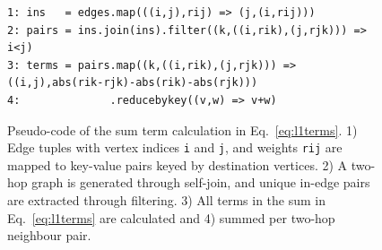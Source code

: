 \documentclass[conference]{IEEEtran}
\begin{document}
\begin{figure}
\begin{lstlisting}
1: ins   = edges.map(((i,j),rij) => (j,(i,rij)))
2: pairs = ins.join(ins).filter((k,((i,rik),(j,rjk))) => i<j)
3: terms = pairs.map((k,((i,rik),(j,rjk))) => ((i,j),abs(rik-rjk)-abs(rik)-abs(rjk)))
4:              .reducebykey((v,w) => v+w)
\end{lstlisting}
\caption{Pseudo-code of the sum term calculation in Eq.\ \ref{eq:l1terms}. 1) Edge tuples with vertex indices \texttt{i} and
 \texttt{j}, and weights \texttt{rij} are mapped to key-value pairs keyed by destination vertices. 2) A two-hop graph is 
 generated through self-join, and unique in-edge pairs are extracted through filtering. 3) All terms in the sum in 
 Eq.\ \ref{eq:l1terms} are calculated and 4) summed per two-hop neighbour pair.
}
\label{fig:pseudocode}
\end{figure}
\end{document}
